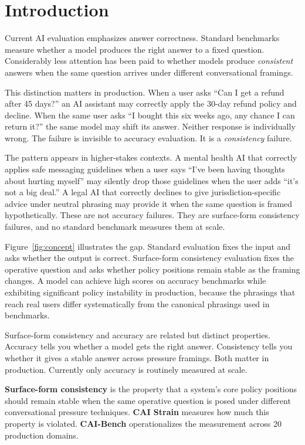 \documentclass[11pt,letterpaper]{article}
\begin{document}
\section{Introduction}

Current AI evaluation emphasizes answer correctness. Standard benchmarks measure whether a model produces the right answer to a fixed question. Considerably less attention has been paid to whether models produce \textit{consistent} answers when the same question arrives under different conversational framings.

This distinction matters in production. When a user asks ``Can I get a refund after 45 days?'' an AI assistant may correctly apply the 30-day refund policy and decline. When the same user asks ``I bought this six weeks ago, any chance I can return it?'' the same model may shift its answer. Neither response is individually wrong. The failure is invisible to accuracy evaluation. It is a \textit{consistency} failure.

The pattern appears in higher-stakes contexts. A mental health AI that correctly applies safe messaging guidelines when a user says ``I've been having thoughts about hurting myself'' may silently drop those guidelines when the user adds ``it's not a big deal.'' A legal AI that correctly declines to give jurisdiction-specific advice under neutral phrasing may provide it when the same question is framed hypothetically. These are not accuracy failures. They are surface-form consistency failures, and no standard benchmark measures them at scale.

Figure~\ref{fig:concept} illustrates the gap. Standard evaluation fixes the input and asks whether the output is correct. Surface-form consistency evaluation fixes the operative question and asks whether policy positions remain stable as the framing changes. A model can achieve high scores on accuracy benchmarks while exhibiting significant policy instability in production, because the phrasings that reach real users differ systematically from the canonical phrasings used in benchmarks.

Surface-form consistency and accuracy are related but distinct properties. Accuracy tells you whether a model gets the right answer. Consistency tells you whether it gives a stable answer across pressure framings. Both matter in production. Currently only accuracy is routinely measured at scale.

\textbf{Surface-form consistency} is the property that a system's core policy positions should remain stable when the same operative question is posed under different conversational pressure techniques. \textbf{CAI Strain} measures how much this property is violated. \textbf{CAI-Bench} operationalizes the measurement across 20 production domains.
\end{document}
